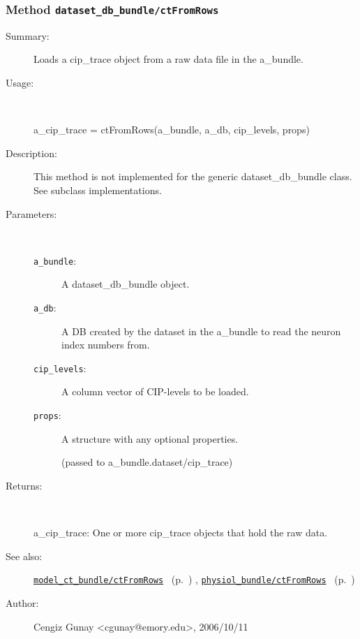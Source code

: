 \subsubsection[Method \texttt{ctFromRows}]{Method \texttt{dataset\_db\_bundle/ctFromRows}}%
%
\label{ref_dataset_db_bundle__ctFromRows}%
\hypertarget{ref_dataset_db_bundle__ctFromRows}{}%
\begin{description}
\item[Summary:]Loads a cip\_trace object from a raw data file in the a\_bundle.
%
\item[Usage:]~%
\begin{lyxcode}%
a\_cip\_trace = ctFromRows(a\_bundle, a\_db, cip\_levels, props)
%
\end{lyxcode}%
%
\item[Description:]%
This method is not implemented for the generic dataset\_db\_bundle class. See 
 subclass implementations.
\item[Parameters:]~
\begin{description}%
\item[\texttt{a\_bundle}:]
 A dataset\_db\_bundle object.
\item[\texttt{a\_db}:]
 A DB created by the dataset in the a\_bundle to read the neuron index numbers from.
\item[\texttt{cip\_levels}:]
 A column vector of CIP-levels to be loaded.
\item[\texttt{props}:]
 A structure with any optional properties.

(passed to a\_bundle.dataset/cip\_trace)\end{description}%
%
\item[Returns:]~

	a\_cip\_trace: One or more cip\_trace objects that hold the raw data.
%
%
\item[See also:]%
\hyperlink{ref_model_ct_bundle__ctFromRows}{\texttt{model\_ct\_bundle/ctFromRows}}%
\ (p.~\pageref{ref_model_ct_bundle__ctFromRows})%
%
, \hyperlink{ref_physiol_bundle__ctFromRows}{\texttt{physiol\_bundle/ctFromRows}}%
\ (p.~\pageref{ref_physiol_bundle__ctFromRows})%
%
%
\item[Author:]%
Cengiz Gunay <cgunay@emory.edu>, 2006/10/11%
\end{description}
\methodline%
